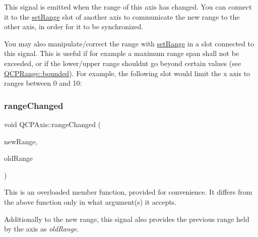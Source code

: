 This signal is emitted when the range of this axis has changed. You can connect it to the \mbox{\hyperlink{class_q_c_p_axis_aebdfea5d44c3a0ad2b4700cd4d25b641}{set\+Range}} slot of another axis to communicate the new range to the other axis, in order for it to be synchronized.

You may also manipulate/correct the range with \mbox{\hyperlink{class_q_c_p_axis_aebdfea5d44c3a0ad2b4700cd4d25b641}{set\+Range}} in a slot connected to this signal. This is useful if for example a maximum range span shall not be exceeded, or if the lower/upper range shouldn\textquotesingle{}t go beyond certain values (see \mbox{\hyperlink{class_q_c_p_range_a22151e18d961d762d25721211e89c2e5}{Q\+C\+P\+Range\+::bounded}}). For example, the following slot would limit the x axis to ranges between 0 and 10\+: 
\begin{DoxyCode}{0}
\end{DoxyCode}
 \mbox{\label{class_q_c_p_axis_aac8576288e8e31f16186124bc10dd10d}} 
\subsubsection{\texorpdfstring{rangeChanged}{rangeChanged}\hspace{0.1cm}{\footnotesize\ttfamily [2/2]}}
{\footnotesize\ttfamily void Q\+C\+P\+Axis\+::range\+Changed (\begin{DoxyParamCaption}\item[{const \mbox{\hyperlink{class_q_c_p_range}{Q\+C\+P\+Range}} \&}]{new\+Range,  }\item[{const \mbox{\hyperlink{class_q_c_p_range}{Q\+C\+P\+Range}} \&}]{old\+Range }\end{DoxyParamCaption})\hspace{0.3cm}{\ttfamily [signal]}}

This is an overloaded member function, provided for convenience. It differs from the above function only in what argument(s) it accepts.

Additionally to the new range, this signal also provides the previous range held by the axis as {\itshape old\+Range}. \mbox{\label{class_q_c_p_axis_ab9866dd1a78f1920f491ec12a794bec2}} 
